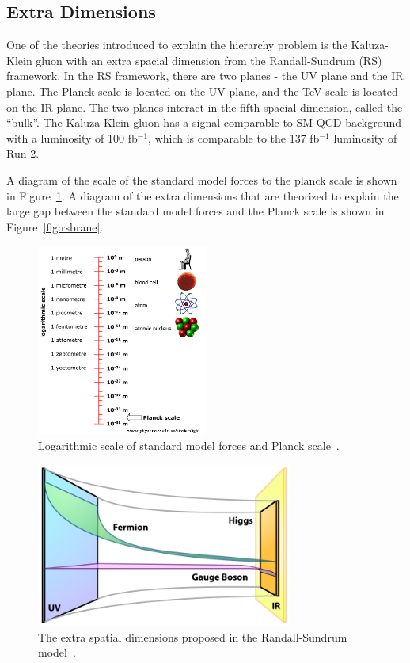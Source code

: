 \subsection{Extra Dimensions}

One of the theories introduced to explain the hierarchy problem is the Kaluza-Klein gluon with an extra spacial dimension from the Randall-Sundrum (RS) framework. In the RS framework, there are two planes - the UV plane and the IR plane. The Planck scale is located on the UV plane, and the TeV scale is located on the IR plane. The two planes interact in the fifth spacial dimension, called the “bulk”. The Kaluza-Klein gluon has a signal comparable to SM QCD background with a luminosity of 100 fb$^{-1}$, which is comparable to the 137 fb$^{-1}$ luminosity of Run 2.

A diagram of the scale of the standard model forces to the planck scale is shown in Figure~\ref{fig:planck}. A diagram of the extra dimensions that are theorized to explain the large gap between the standard model forces and the Planck scale is shown in Figure~\ref{fig:rsbrane}.

\begin{figure}[h]
	\centering
	\includegraphics[width=0.5\textwidth]{figures/Planck_scale.png}
	\caption{Logarithmic scale of standard model forces and Planck scale~\cite{Planck_scale}.}
	\label{fig:planck}
\end{figure}

\begin{figure}[h]
	\centering
	\includegraphics[width=0.75\textwidth]{figures/RSBrane.png}
	\caption{The extra spatial dimensions proposed in the Randall-Sundrum model~\cite{RSBrane}.}
	\label{fig:rsrbane}
\end{figure}


